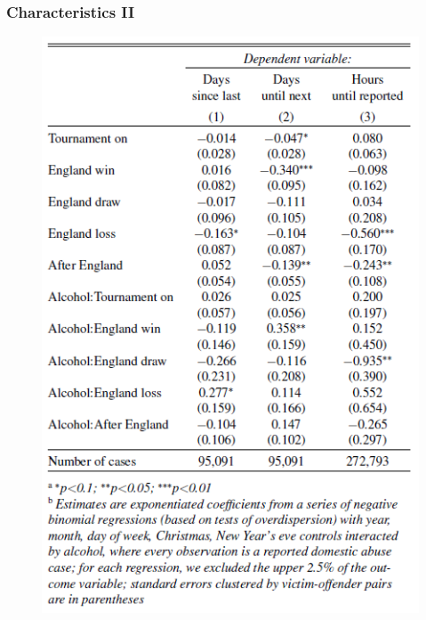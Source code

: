 \documentclass[hyperref={pdfpagelabels=false}]{beamer}
\begin{document}
\begin{frame}
\frametitle{Characteristics II}
\begin{center}
\begin{figure}
\includegraphics[scale=0.45]{append3.png}
\end{figure}
\end{center}
\end{frame}
\end{document}
